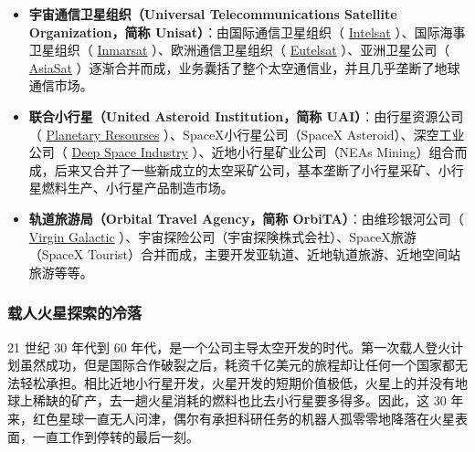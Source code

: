 \documentclass[letterpaper,10pt]{sphinxmanual}
\begin{document}
\begin{itemize}
\item {} 
\textbf{宇宙通信卫星组织（Universal Telecommunications Satellite Organization，简称 Unisat）}：由国际通信卫星组织（ \href{http://en.wikipedia.org/wiki/Intelsat}{Intelsat} ）、国际海事卫星组织（ \href{http://en.wikipedia.org/wiki/Inmarsat}{Inmarsat} ）、欧洲通信卫星组织（ \href{http://en.wikipedia.org/wiki/Eutelsat}{Eutelsat} ）、亚洲卫星公司（ \href{http://en.wikipedia.org/wiki/AsiaSat}{AsiaSat} ）逐渐合并而成，业务囊括了整个太空通信业，并且几乎垄断了地球通信市场。

\end{itemize}

\begin{itemize}
\item {} 
\textbf{联合小行星（United Asteroid Institution，简称 UAI）}：由行星资源公司（ \href{http://www.planetaryresources.com}{Planetary Resourses} ）、SpaceX小行星公司（SpaceX Asteroid）、深空工业公司（ \href{http://deepspaceindustries.com}{Deep Space Industry} ）、近地小行星矿业公司（NEAs Mining）组合而成，后来又合并了一些新成立的太空采矿公司，基本垄断了小行星采矿、小行星燃料生产、小行星产品制造市场。

\end{itemize}

\begin{itemize}
\item {} 
\textbf{轨道旅游局（Orbital Travel Agency，简称 OrbiTA）}：由维珍银河公司（ \href{http://en.wikipedia.org/wiki/Virgin\_Galactic}{Virgin Galactic} ）、宇宙探险公司（宇宙探険株式会社）、SpaceX旅游（SpaceX Tourist）合并而成，主要开发亚轨道、近地轨道旅游、近地空间站旅游等等。

\end{itemize}


\subsubsection{载人火星探索的冷落}
\label{history:id9}
21 世纪 30 年代到 60 年代，是一个公司主导太空开发的时代。第一次载人登火计划虽然成功，但是国际合作破裂之后，耗资千亿美元的旅程却让任何一个国家都无法轻松承担。相比近地小行星开发，火星开发的短期价值极低，火星上的并没有地球上稀缺的矿产，去一趟火星消耗的燃料也比去小行星要多得多。因此，这 30 年来，红色星球一直无人问津，偶尔有承担科研任务的机器人孤零零地降落在火星表面，一直工作到停转的最后一刻。
\end{document}
